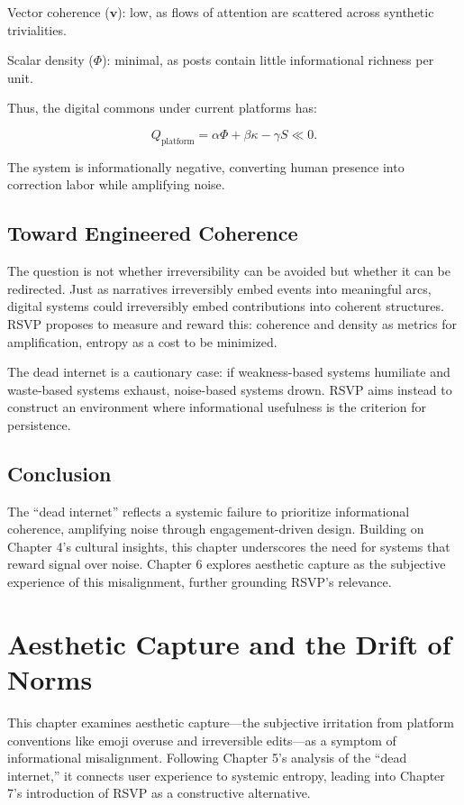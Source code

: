 \documentclass{book}
\begin{document}
Vector coherence (\(\mathbf{v}\)): low, as flows of attention are scattered across synthetic trivialities.

Scalar density (\(\Phi\)): minimal, as posts contain little informational richness per unit.

Thus, the digital commons under current platforms has:

\[ Q_{\text{platform}} = \alpha \Phi + \beta \kappa - \gamma S \ll 0. \]

The system is informationally negative, converting human presence into correction labor while amplifying noise.

\section{Toward Engineered Coherence}

The question is not whether irreversibility can be avoided but whether it can be redirected. Just as narratives irreversibly embed events into meaningful arcs, digital systems could irreversibly embed contributions into coherent structures. RSVP proposes to measure and reward this: coherence and density as metrics for amplification, entropy as a cost to be minimized.

The dead internet is a cautionary case: if weakness-based systems humiliate and waste-based systems exhaust, noise-based systems drown. RSVP aims instead to construct an environment where informational usefulness is the criterion for persistence.

\section{Conclusion}

The ``dead internet'' reflects a systemic failure to prioritize informational coherence, amplifying noise through engagement-driven design. Building on Chapter 4’s cultural insights, this chapter underscores the need for systems that reward signal over noise. Chapter 6 explores aesthetic capture as the subjective experience of this misalignment, further grounding RSVP’s relevance.

\chapter{Aesthetic Capture and the Drift of Norms}

This chapter examines aesthetic capture—the subjective irritation from platform conventions like emoji overuse and irreversible edits—as a symptom of informational misalignment. Following Chapter 5’s analysis of the ``dead internet,'' it connects user experience to systemic entropy, leading into Chapter 7’s introduction of RSVP as a constructive alternative.
\end{document}
